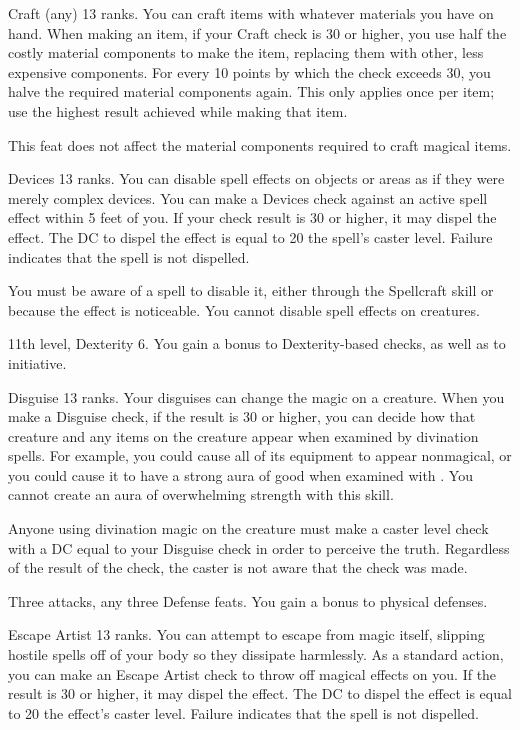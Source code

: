 \featpre Craft (any) 13 ranks.
\featben You can craft items with whatever materials you have on hand.
When making an item, if your Craft check is 30 or higher, you use half the costly material components to make the item, replacing them with other, less expensive components.
For every 10 points by which the check exceeds 30, you halve the required material components again.
This only applies once per item; use the highest result achieved while making that item.

This feat does not affect the material components required to craft magical items.

\featpre Devices 13 ranks.
\featben You can disable spell effects on objects or areas as if they were merely complex devices.
You can make a Devices check against an active spell effect within 5 feet of you.
If your check result is 30 or higher, it may dispel the effect.
The DC to dispel the effect is equal to 20 \add the spell's caster level.
Failure indicates that the spell is not dispelled.

You must be aware of a spell to disable it, either through the Spellcraft skill or because the effect is noticeable.
You cannot disable spell effects on creatures.

\featpre 11th level, Dexterity 6.
\featben You gain a  bonus to Dexterity-based checks, as well as to initiative.

\featpre Disguise 13 ranks.
\featben Your disguises can change the magic on a creature.
When you make a Disguise check, if the result is 30 or higher, you can decide how that creature and any items on the creature appear when examined by divination spells.
For example, you could cause all of its equipment to appear nonmagical, or you could cause it to have a strong aura of good when examined with .
You cannot create an aura of overwhelming strength with this skill.

Anyone using divination magic on the creature must make a caster level check with a DC equal to your Disguise check in order to perceive the truth.
Regardless of the result of the check, the caster is not aware that the check was made.

\featpre Three attacks, any three Defense feats.
\featben You gain a  bonus to physical defenses.

\featpre Escape Artist 13 ranks.
\featben You can attempt to escape from magic itself, slipping hostile spells off of your body so they dissipate harmlessly.
As a standard action, you can make an Escape Artist check to throw off magical effects on you.
If the result is 30 or higher, it may dispel the effect.
The DC to dispel the effect is equal to 20 \add the effect's caster level.
Failure indicates that the spell is not dispelled.

